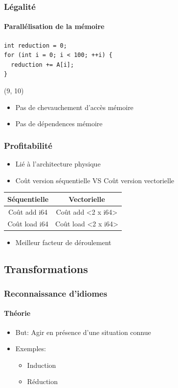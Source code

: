 \documentclass{beamer}
\begin{document}
\begin{frame}[fragile]
\frametitle{Légalité}
\framesubtitle{Parallélisation de la mémoire}
\begin{lstlisting}
int reduction = 0;
for (int i = 0; i < 100; ++i) {
  reduction += A[i];
}
\end{lstlisting}

\begin{textblock}{6}(9, 10)
	\begin{itemize}
	\item<2->[\checkmark] Pas de chevauchement d'accès mémoire
	\item<3->[\checkmark] Pas de dépendences mémoire
	\end{itemize}
\end{textblock}
\end{frame}

\begin{frame}
\frametitle{Profitabilité}
\begin{itemize}
\item Lié à l'architecture physique
\item Coût version séquentielle VS Coût version vectorielle
\end{itemize}

\begin{center}
\begin{tabular}{ | c | c | }
  \hline
  Séquentielle & Vectorielle \\
  \hline
  Coût add i64 & Coût add \textless2 x i64\textgreater \\
  \hline
  Coût load i64 & Coût load \textless2 x i64\textgreater \\
  \hline
\end{tabular}
\end{center}

\begin{itemize}
\item Meilleur facteur de déroulement
\end{itemize}
\end{frame}

\subsection{Transformations}
\begin{frame}
\frametitle{Reconnaissance d'idiomes}
\framesubtitle{Théorie}
\begin{itemize}
\item But: Agir en présence d'une situation connue
\item Exemples:
\begin{itemize}
\item Induction
\item Réduction
\end{itemize}
\end{itemize}
\end{frame}
\end{document}
